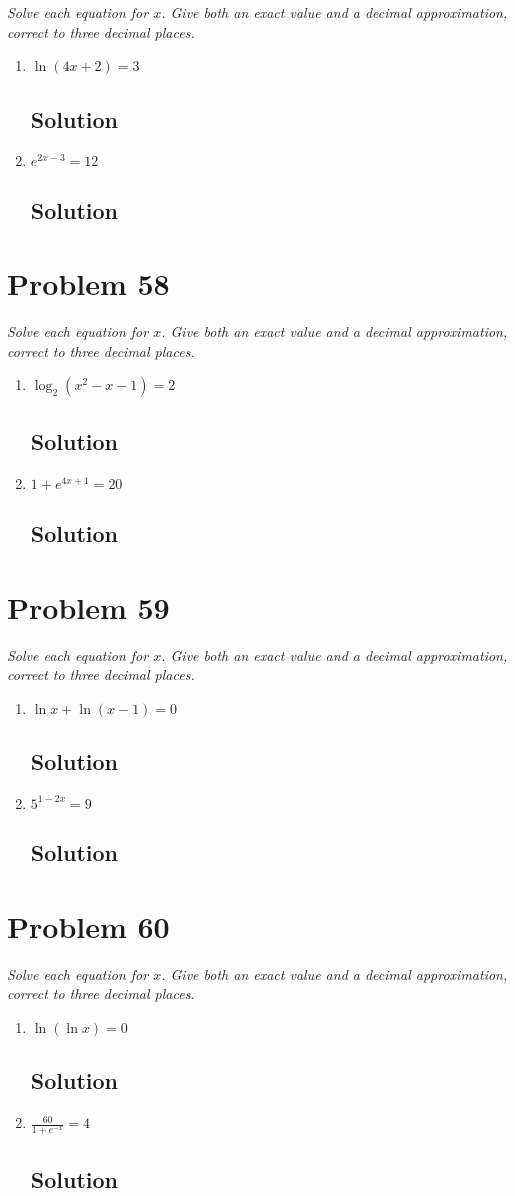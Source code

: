 \documentclass[11pt]{article}
\newcommand{\soln}{\subsection*}
\newcommand{\qn}{\textit}
\begin{document}
\qn{Solve each equation for $x$. Give both an exact value and a decimal approximation, correct to three decimal places.}
\begin{enumerate}
	\item \qn{$\ln(4x+2)=3$}
	\soln{Solution}
	
	\item \qn{$e^{2x-3}=12$}
	\soln{Solution}
\end{enumerate}

\section*{Problem 58}

\qn{Solve each equation for $x$. Give both an exact value and a decimal approximation, correct to three decimal places.}
\begin{enumerate}
	\item \qn{$\log_2(x^2-x-1)=2$}
	\soln{Solution}
	
	\item \qn{$1+e^{4x+1}=20$}
	\soln{Solution}
\end{enumerate}

\section*{Problem 59}

\qn{Solve each equation for $x$. Give both an exact value and a decimal approximation, correct to three decimal places.}
\begin{enumerate}
	\item \qn{$\ln{x}+\ln(x-1)=0$}
	\soln{Solution}
	
	\item \qn{$5^{1-2x}=9$}
	\soln{Solution}
\end{enumerate}

\section*{Problem 60}

\qn{Solve each equation for $x$. Give both an exact value and a decimal approximation, correct to three decimal places.}
\begin{enumerate}
	\item \qn{$\ln(\ln{x})=0$}
	\soln{Solution}
	
	\item \qn{$\frac{60}{1+e^{-x}}=4$}
	\soln{Solution}
\end{enumerate}
\end{document}
